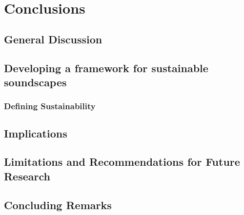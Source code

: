 \chapter{Conclusions}
\label{ch:conc}

\section{General Discussion}

\section{Developing a framework for sustainable soundscapes}

\subsection{Defining Sustainability}



\section{Implications}

\section{Limitations and Recommendations for Future Research}

\section{Concluding Remarks}